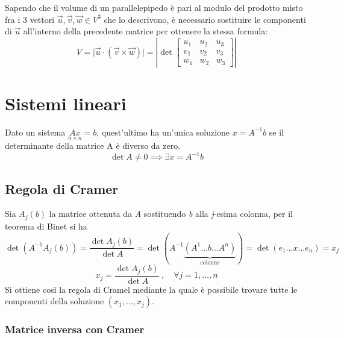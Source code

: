 			Sapendo che il volume di un parallelepipedo è pari al modulo del prodotto misto fra i 3 vettori $\vec{u}, \vec{v}, \vec{w} \in V^3$ che lo descrivono, è necessario sostituire le componenti di $\vec{u}$ all'interno della precedente matrice per ottenere la stessa formula:
			$$V = \vert \vec{u} \cdot (\vec{v} \times \vec{w}) \vert = 
			\left\vert \det \begin{bmatrix}
				u_1 & u_2 & u_3 \\
				v_1 & v_2 & v_3 \\
				w_1 & w_2 & w_3
			\end{bmatrix} \right\vert$$
	\section{Sistemi lineari}
		Dato un sistema $\underset{n \times n}{Ax} = b$, quest'ultimo ha un'unica soluzione $x = A^{-1}b$ se il determinante della matrice A è diverso da zero.
		$$\det A \neq 0 \implies \exists x = A^{-1} b$$
		
		\subsection{Regola di Cramer}
			Sia $A_j(b)$ la matrice ottenuta da \textit{A} sostituendo \textit{b} alla \textit{j}-esima colonna, per il teorema di Binet si ha			
			$$\det (A^{-1} A_j (b)) = \frac{\det A_j (b)}{\det A} = \det (A^{-1} \underbrace{(A^1 \dots b \dots A^n)}_{\text{colonne}}) = \det (e_1 \dots x \dots e_n) = x_j$$
			$$x_j = \frac{\det A_j (b)}{\det A} \: , \quad \forall j = 1, \dots, n$$
			Si ottiene così la regola di Cramel mediante la quale è possibile trovare tutte le componenti della soluzione $(x_1, \dots, x_j)$.
		
			\subsubsection{Matrice inversa con Cramer}
			
			